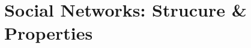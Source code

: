 \section{Social Networks: Strucure \& Properties} %
\label{sec:social_networks_strucure_&_properties}


